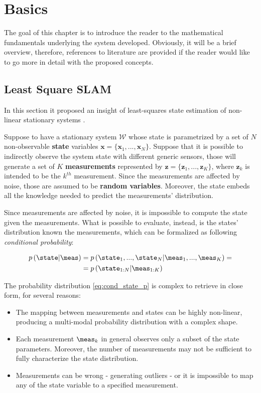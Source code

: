 \chapter{Basics}\label{ch:basics}
The goal of this chapter is to introduce the reader to the mathematical fundamentals underlying the system developed. Obviously, it will be a brief overview, therefore, references to literature are provided if the reader would like to go more in detail with the proposed concepts.

\section{Least Square SLAM}\label{sec:ls_formulation}
In this section it proposed an insight of least-squares state estimation of non-linear stationary systems \cite{charnes1976least-squares}.

Suppose to have a stationary system $\mathcal{W}$ whose state is parametrized by a set of $N$ non-observable \textbf{state} variables $\mathbf{x} = \{\mathbf{x}_1, ..., \mathbf{x}_N\}$. Suppose that it is possible to indirectly observe the system state with different generic sensors, those will generate a set of $K$ \textbf{measurements} represented by $\mathbf{z} = \{\mathbf{z}_1, ..., \mathbf{z}_K\}$, where $\mathbf{z}_k$ is intended to be the $k^{th}$ measurement. Since the measurements are affected by noise, those are assumed to be \textbf{random variables}. Moreover, the state embeds all the knowledge needed to predict the measurements' distribution.

Since measurements are affected by noise, it is impossible to compute the state given the measurements. What is possible to evaluate, instead, is the states' distribution known the measurements, which can be formalized as following \textit{conditional probability}:

\begin{align} 
    p\left(\state | \meas\right) &= p\left(\state_1, ..., \state_N | \meas_1, ..., \meas_K\right) = \nonumber \\
    &= p\left(\state_{1:N} | \meas_{1:K}\right)
    \label{eq:cond_state_p}
\end{align}

The probability distribution \ref{eq:cond_state_p} is complex to retrieve in close form, for several reasons: 
\begin{itemize}
    \item The mapping between measurements and states can be highly non-linear, producing a multi-modal probability distribution with a complex shape.
    \item Each measurement $\meas_k$ in general observes only a subset of the state parameters. Moreover, the number of measurements may not be sufficient to fully characterize the state distribution.
    \item Measurements can be wrong - generating outliers - or it is impossible to map any of the state variable to a specified measurement.
\end{itemize}

